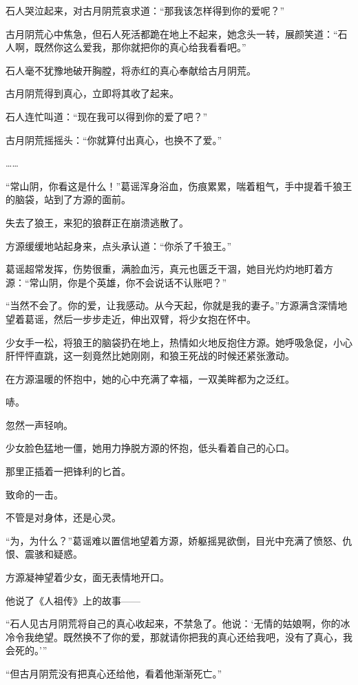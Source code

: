 \begin{this_body}
石人哭泣起来，对古月阴荒哀求道：“那我该怎样得到你的爱呢？”

古月阴荒心中焦急，但石人死活都跪在地上不起来，她念头一转，展颜笑道：“石人啊，既然你这么爱我，那你就把你的真心给我看看吧。”

石人毫不犹豫地破开胸膛，将赤红的真心奉献给古月阴荒。

古月阴荒得到真心，立即将其收了起来。

石人连忙叫道：“现在我可以得到你的爱了吧？”

古月阴荒摇摇头：“你就算付出真心，也换不了爱。”

……

“常山阴，你看这是什么！”葛谣浑身浴血，伤痕累累，喘着粗气，手中提着千狼王的脑袋，站到了方源的面前。

失去了狼王，来犯的狼群正在崩溃逃散了。

方源缓缓地站起身来，点头承认道：“你杀了千狼王。”

葛谣超常发挥，伤势很重，满脸血污，真元也匮乏干涸，她目光灼灼地盯着方源：“常山阴，你是个英雄，你不会说话不认账吧？”

“当然不会了。你的爱，让我感动。从今天起，你就是我的妻子。”方源满含深情地望着葛谣，然后一步步走近，伸出双臂，将少女抱在怀中。

少女手一松，将狼王的脑袋扔在地上，热情如火地反抱住方源。她呼吸急促，小心肝怦怦直跳，这一刻竟然比她刚刚，和狼王死战的时候还紧张激动。

在方源温暖的怀抱中，她的心中充满了幸福，一双美眸都为之泛红。

哧。

忽然一声轻响。

少女脸色猛地一僵，她用力挣脱方源的怀抱，低头看着自己的心口。

那里正插着一把锋利的匕首。

致命的一击。

不管是对身体，还是心灵。

“为，为什么？”葛谣难以置信地望着方源，娇躯摇晃欲倒，目光中充满了愤怒、仇恨、震骇和疑惑。

方源凝神望着少女，面无表情地开口。

他说了《人祖传》上的故事——

“石人见古月阴荒将自己的真心收起来，不禁急了。他说：‘无情的姑娘啊，你的冰冷令我绝望。既然换不了你的爱，那就请你把我的真心还给我吧，没有了真心，我会死的。’”

“但古月阴荒没有把真心还给他，看着他渐渐死亡。”


\end{this_body}
